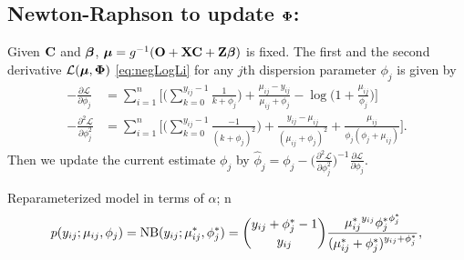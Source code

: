 \documentclass[12pt]{article}
\newcommand{\bbL}{\mathcal{L}}
\newcommand{\bs}{\boldsymbol}
\newcommand{\cb}{\color{blue}}
\begin{document}
\subsection{Newton-Raphson to update  $\mbox{\boldmath $\Phi$}$:}\label{par:nrphi}
Given ${\bf C}$ and $\mbox{\boldmath $\beta$}$, $\bs\mu = g^{-1}(\bO + \X\C + \Z\bbeta)$ is fixed.  The first and the  second derivative $\bbL(\bs\mu,\bPhi)$ \eqref{eq:negLogLi} for any $j$th dispersion parameter $\phi_j$ is given by 
\begin{align*}
-\frac{\partial\bbL }{\partial \phi_j}  &= \sum_{i = 1}^n\Bigg[\Big( \sum_{k = 0}^{y_{ij} - 1}\frac{1}{k+\phi_j}\Big) + \frac{\mu_{ij} - y_{ij}}{\mu_{ij} + \phi_j} - \log\Big(1 + \frac{\mu_{ij}}{\phi_j} \Big)\Bigg] \\
-\frac{\partial^2\bbL }{\partial \phi_j^2}  &= \sum_{i = 1}^n\Bigg[\Big( \sum_{k = 0}^{y_{ij} - 1}\frac{-1}{(k+\phi_j)^2}\Big) + \frac{y_{ij} - \mu_{ij}}{(\mu_{ij} + \phi_j)^2} + \frac{\mu_{ij}}{\phi_j(\phi_j + \mu_{ij})} \Bigg].
\end{align*}
Then we update the current estimate $\phi_j$  by $\hat{\phi}_j = \phi_j - \Big(\frac{\partial^2\bbL }{\partial \phi_j^2}\Big)^{-1} \frac{\partial\bbL }{\partial \phi_j} $. 

{\cb Reparameterized model in terms of $\alpha$; n}
\citep{ismail2007handling}
\begin{align*}
p(y_{ij}; \mu_{ij}, \phi_j)  = \mbox{NB}(y_{ij};  \mu_{ij}^*, \phi_j^*) = {y_{ij} + \phi_j^* -1 \choose y_{ij}}  \frac{{\mu_{ij}^*}^{y_{ij}} {\phi_j^*}^{\phi_j^*} }{(\mu_{ij}^* + \phi_j^*)^{y_{ij} + \phi_j^*} },
\end{align*}
\end{document}
